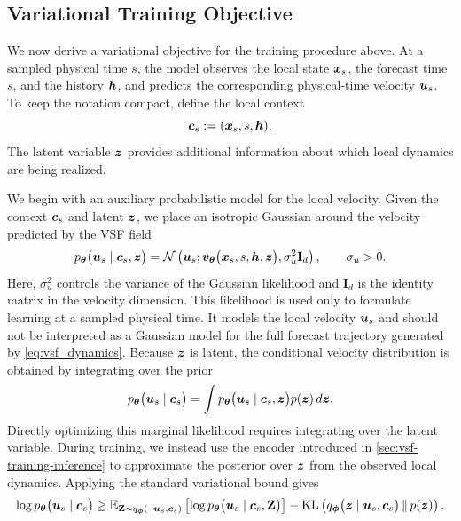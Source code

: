 \subsection{Variational Training Objective}
\label{sec:vsf-objective}

We now derive a variational objective for the training procedure above. At a
sampled physical time $s$, the model observes the local state ${\bm{x}}_s$, the
forecast time $s$, and the history ${\bm{h}}$, and predicts the corresponding
physical-time velocity ${\bm{u}}_s$. To keep the notation compact, define the local
context
\begin{equation}
{\bm{c}}_s := ({\bm{x}}_s,s,{\bm{h}}).
\label{eq:vsf_local_context}
\end{equation}
The latent variable ${\bm{z}}$ provides additional information about which local
dynamics are being realized.

We begin with an auxiliary probabilistic model for the local velocity. Given
the context ${\bm{c}}_s$ and latent ${\bm{z}}$, we place an isotropic Gaussian around
the velocity predicted by the VSF field
%
\begin{equation}
p_{{\bm{\theta}}}
\bigl(
{\bm{u}}_s
\mid
{\bm{c}}_s,{\bm{z}}
\bigr)
=
\mathcal N
\left(
{\bm{u}}_s;
{\bm{v}}_{{\bm{\theta}}}
\bigl(
{\bm{x}}_s,s,{\bm{h}},{\bm{z}}
\bigr),
\sigma_u^2\mathbf I_d
\right),
\qquad
\sigma_u>0.
\label{eq:gaussian_velocity_likelihood}
\end{equation}
%
Here, $\sigma_u^2$ controls the variance of the Gaussian likelihood and
$\mathbf I_d$ is the identity matrix in the velocity dimension. This
likelihood is used only to formulate learning at a sampled physical time. It
models the local velocity ${\bm{u}}_s$ and should not be interpreted as a Gaussian
model for the full forecast trajectory generated by \cref{eq:vsf_dynamics}.
%
Because ${\bm{z}}$ is latent, the conditional velocity distribution is obtained by
integrating over the prior
%
\begin{equation}
p_{{\bm{\theta}}}
\bigl(
{\bm{u}}_s
\mid
{\bm{c}}_s
\bigr)
=
\int
p_{{\bm{\theta}}}
\bigl(
{\bm{u}}_s
\mid
{\bm{c}}_s,{\bm{z}}
\bigr)
p({\bm{z}})
\,d{\bm{z}}.
\label{eq:vsf_velocity_evidence}
\end{equation}
%
Directly optimizing this marginal likelihood requires integrating over the
latent variable. During training, we instead use the encoder introduced in \cref{sec:vsf-training-inference} to approximate the posterior over
${\bm{z}}$ from the observed local dynamics. Applying the standard variational
bound gives
\begin{align*}
\log
p_{{\bm{\theta}}}
\bigl(
{\bm{u}}_s
\mid
{\bm{c}}_s
\bigr)
\geq{}
\mathbb E_{
\mathbf Z\sim
q_{\boldsymbol{\phi}}(\cdot\mid{\bm{u}}_s,{\bm{c}}_s)
}
\left[
\log
p_{{\bm{\theta}}}
\bigl(
{\bm{u}}_s
\mid
{\bm{c}}_s,\mathbf Z
\bigr)
\right]
\notag -
\operatorname{KL}
\left(
q_{\boldsymbol{\phi}}
\bigl(
{\bm{z}}
\mid
{\bm{u}}_s,{\bm{c}}_s
\bigr)
\,\Vert\,
p({\bm{z}})
\right).
\end{align*}

